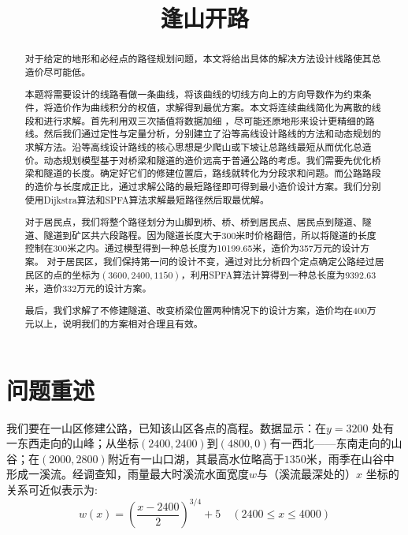 \documentclass[bwprint]{cumcmthesis}
\title{逢山开路}
\begin{document}
 \maketitle

\begin{abstract}

对于给定的地形和必经点的路径规划问题，本文将给出具体的解决方法设计线路使其总造价尽可能低。

本题将需要设计的线路看做一条曲线，将该曲线的切线方向上的方向导数作为约束条件，将造价作为曲线积分的权值，求解得到最优方案。本文将连续曲线简化为离散的线段和进行求解。首先利用双三次插值将数据加细 ，尽可能还原地形来设计更精细的路线。然后我们通过定性与定量分析，分别建立了沿等高线设计路线的方法和动态规划的求解方法。沿等高线设计路线的核心思想是少爬山或下坡让总路线最短从而优化总造价。动态规划模型基于对桥梁和隧道的造价远高于普通公路的考虑。我们需要先优化桥梁和隧道的长度。确定好它们的修建位置后，路线就转化为分段求和问题。而公路路段的造价与长度成正比，通过求解公路的最短路径即可得到最小造价设计方案。我们分别使用Dijkstra算法和SPFA算法求解最短路径然后取最优解。

对于居民点，我们将整个路径划分为山脚到桥、桥、桥到居民点、居民点到隧道、隧道、隧道到矿区共六段路程。因为隧道长度大于300米时价格翻倍，所以将隧道的长度控制在300米之内。通过模型得到一种总长度为10199.65米，造价为357万元的设计方案。
对于居民区，我们保持第一问的设计不变，通过对比分析四个定点确定公路经过居民区的点的坐标为$(3600,2400,1150)$，利用SPFA算法计算得到一种总长度为9392.63米，造价332万元的设计方案。

最后，我们求解了不修建隧道、改变桥梁位置两种情况下的设计方案，造价均在400万元以上，说明我们的方案相对合理且有效。


\end{abstract}

\tableofcontents
\newpage
\section{问题重述}
	我们要在一山区修建公路，已知该山区各点的高程。数据显示：在$y=3200$ 处有一东西走向的山峰；从坐标$(2400,2400)$到$(4800,0)$有一西北——东南走向的山谷；在$(2000,2800)$附近有一山口湖，其最高水位略高于$1350$米，雨季在山谷中形成一溪流。经调查知，雨量最大时溪流水面宽度$w$与（溪流最深处的）$x$ 坐标的关系可近似表示为:
\begin{equation}
	w(x) = (\frac{x-2400}{2})^{3/4}+5\quad (2400 \leqslant x \leqslant 4000)
	\label{河流计算}
\end{equation}
\end{document}
